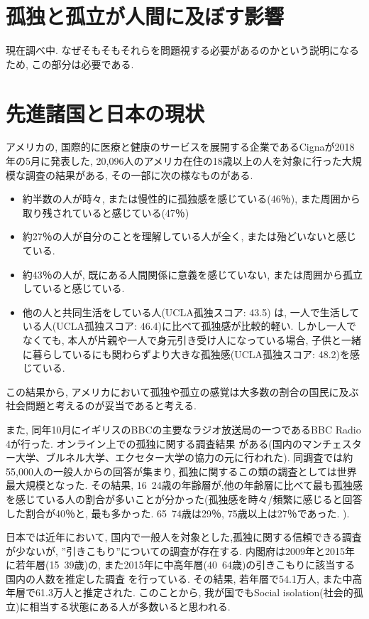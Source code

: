\documentclass[a4paper,dvipdfmx]{hisken}
\begin{document}
\section{孤独と孤立が人間に及ぼす影響}
現在調べ中. なぜそもそもそれらを問題視する必要があるのかという説明になるため, この部分は必要である. 

\section{先進諸国と日本の現状}
アメリカの, 国際的に医療と健康のサービスを展開する企業であるCignaが2018年の5月に発表した, 20,096人のアメリカ在住の18歳以上の人を対象に行った大規模な調査の結果{}\cite{tex4}がある, その一部に次の様なものがある. 
\begin{itemize}
\item 約半数の人が時々, または慢性的に孤独感を感じている(46％), また周囲から取り残されていると感じている(47％)
\item 約27％の人が自分のことを理解している人が全く, または殆どいないと感じている. 
\item 約43％の人が, 既にある人間関係に意義を感じていない, または周囲から孤立していると感じている. 
\item 他の人と共同生活をしている人(UCLA孤独スコア: 43.5) は, 一人で生活している人(UCLA孤独スコア: 46.4)に比べて孤独感が比較的軽い. しかし一人でなくても, 本人が片親や一人で身元引き受け人になっている場合, 子供と一緒に暮らしているにも関わらずより大きな孤独感(UCLA孤独スコア: 48.2)を感じている. 
\end{itemize}


この結果から, アメリカにおいて孤独や孤立の感覚は大多数の割合の国民に及ぶ社会問題と考えるのが妥当であると考える.

また, 同年10月にイギリスのBBCの主要なラジオ放送局の一つであるBBC Radio 4が行った. オンライン上での孤独に関する調査結果{}\cite{tex5} {}\cite{tex6}がある(国内のマンチェスター大学、ブルネル大学、エクセター大学の協力の元に行われた). 同調査では約55,000人の一般人からの回答が集まり, 孤独に関するこの類の調査としては世界最大規模となった. 
その結果, 16~24歳の年齢層が,他の年齢層に比べて最も孤独感を感じている人の割合が多いことが分かった(孤独感を時々/頻繁に感じると回答した割合が40％と, 最も多かった. 65~74歳は29％, 75歳以上は27％であった. ). 

日本では近年において, 国内で一般人を対象とした,孤独に関する信頼できる調査が少ないが, ”引きこもり”についての調査が存在する. 
内閣府は2009年と2015年に若年層(15~39歳)の, また2015年に中高年層(40~64歳)の引きこもりに該当する国内の人数を推定した調査{}\cite{tex7} {}\cite{tex8}を行っている. その結果, 若年層で54.1万人, また中高年層で61.3万人と推定された.
このことから, 我が国でもSocial isolation(社会的孤立)に相当する状態にある人が多数いると思われる.
\end{document}
